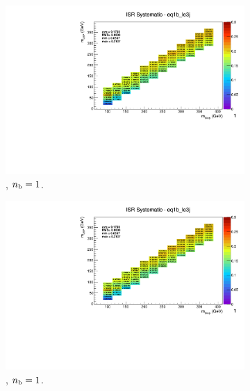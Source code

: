 \begin{figure}[ht!]
\begin{subfigure}[b]{0.32\textwidth}
    \includegraphics[width=\textwidth, page=8]{Figs/sms/t2degen/v19/systs_v2/T2_4body_ISR_eq1b_le3j.pdf}
    \caption{\njlow, $n_{\text{b}} = 1$.}
  \end{subfigure}
  \begin{subfigure}[b]{0.32\textwidth}
    \includegraphics[width=\textwidth, page=1]{Figs/sms/t2degen/v19/systs_v2/T2_4body_ISR_eq1b_le3j.pdf}
    \caption{\njlow, $n_{\text{b}} = 1$.}
  \end{subfigure}\\
  \begin{subfigure}[b]{0.32\textwidth}

\end{subfigure}
\end{figure}
